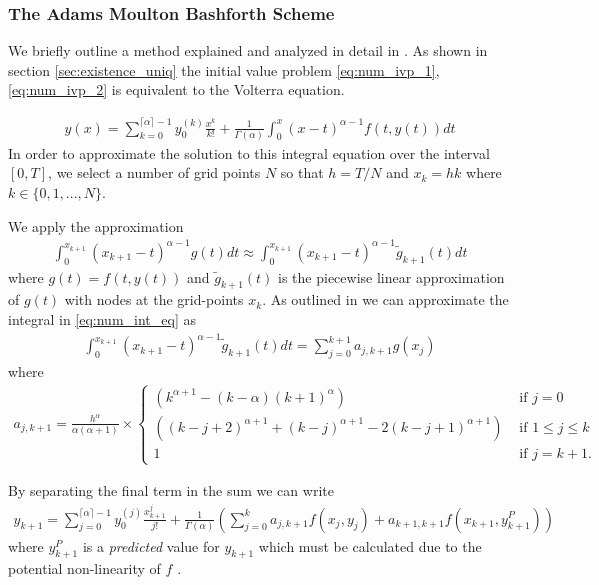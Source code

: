 \subsubsection{The Adams Moulton Bashforth Scheme}
\label{sec:amb_desc}
We briefly outline a method explained and analyzed in detail in \cite{Diethelm2004}. As shown in section \ref{sec:existence_uniq} the initial value problem \eqref{eq:num_ivp_1}, \eqref{eq:num_ivp_2} is equivalent to the Volterra equation.

\begin{align}
    \label{eq:num_int_eq}
    y(x) = \sum_{k=0}^{\lceil \alpha \rceil - 1} y_{0}^{(k)} \frac{x^k}{k!} + \frac{1}{\Gamma(\alpha)} \int_0^x (x-t)^{\alpha - 1} f(t, y(t))dt
\end{align}
In order to approximate the solution to this integral equation over the interval $ [0, T] $, we select a number of grid points $ N $ so that $ h = T / N $ and $ x_k = hk $ where $ k \in \{0, 1, ..., N\} $.

We apply the approximation
\begin{align*}
    \int_0^{x_{k+1}} (x_{k+1} - t)^{\alpha - 1} g(t)dt \approx \int_0^{x_{k+1}} (x_{k+1} - t)^{\alpha - 1} \tilde{g}_{k+1}(t)dt
\end{align*}
where $ g(t) = f(t, y(t)) $ and $ \tilde{g}_{k+1}(t) $ is the piecewise linear approximation of $ g(t) $ with nodes at the grid-points $ x_k $. As outlined in \cite{Diethelm2004} we can approximate the integral in \eqref{eq:num_int_eq} as
\begin{align}
    \label{eq:amb_sum_1}
    \int_{0}^{x_{k+1}} (x_{k+1} - t)^{\alpha - 1} \tilde{g}_{k+1}(t) dt = \sum_{j=0}^{k+1} a_{j,k+1}g(x_j)
\end{align}
where 
\begin{align}
    a_{j,k+1} = \frac{h^\alpha}{\alpha(\alpha+1)} \times
    \begin{cases}
        (k^{\alpha+1}-(k-\alpha)(k+1)^\alpha) & \text{ if } j = 0 \\
        ((k-j+2)^{\alpha + 1} + (k-j)^{\alpha+1} - 2(k-j+1)^{\alpha+1}) & \text{ if } 1 \leq j \leq k \\
        1 & \text{ if } j = k + 1.
    \end{cases}
\end{align}

By separating the final term in the sum we can write
\begin{align}
\label{eq:amb_y_corr}
    y_{k+1} = \sum_{j=0}^{\lceil \alpha \rceil - 1} y_{0}^{(j)} \frac{x^j_{k+1}}{j!} + \frac{1}{\Gamma(\alpha)} \left( \sum_{j=0}^k a_{j,k+1} f(x_j,y_j) + a_{k+1,k+1}f(x_{k+1}, y_{k+1}^P )\right)
\end{align}
where $ y_{k+1}^P $ is a \emph{predicted} value for $ y_{k+1} $ which must be calculated due to the potential non-linearity of $ f $ \cite{Diethelm2004}.

